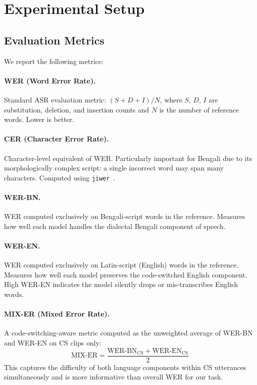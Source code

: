 \section{Experimental Setup}
\label{sec:experiments}

\subsection{Evaluation Metrics}

We report the following metrics:

\paragraph{WER (Word Error Rate).}
Standard ASR evaluation metric: $(S + D + I) / N$, where $S$, $D$, $I$ are
substitution, deletion, and insertion counts and $N$ is the number of
reference words. Lower is better.

\paragraph{CER (Character Error Rate).}
Character-level equivalent of WER. Particularly important for Bengali due to
its morphologically complex script: a single incorrect word may span many
characters. Computed using \texttt{jiwer}~\citep{jiwer}.

\paragraph{WER-BN.}
WER computed exclusively on Bengali-script words in the reference.
Measures how well each model handles the dialectal Bengali component of speech.

\paragraph{WER-EN.}
WER computed exclusively on Latin-script (English) words in the reference.
Measures how well each model preserves the code-switched English component.
High WER-EN indicates the model silently drops or mis-transcribes English words.

\paragraph{MIX-ER (Mixed Error Rate).}
A code-switching-aware metric computed as the unweighted average of WER-BN
and WER-EN on CS clips only:
\begin{equation}
\text{MIX-ER} = \frac{\text{WER-BN}_{\text{CS}} + \text{WER-EN}_{\text{CS}}}{2}
\end{equation}
This captures the difficulty of both language components within CS utterances
simultaneously and is more informative than overall WER for our task.

